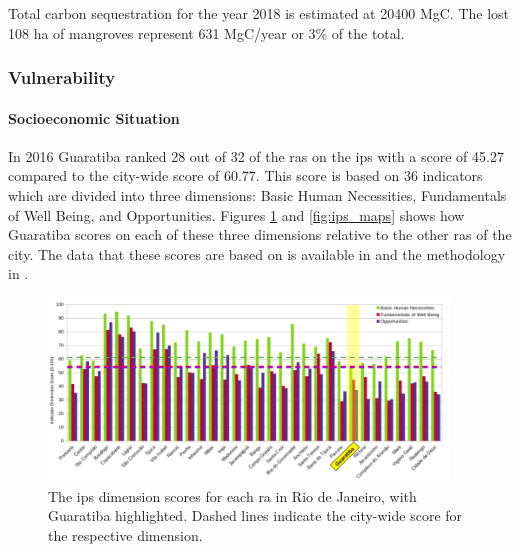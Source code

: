 Total carbon sequestration for the year 2018 is estimated at 20400 MgC. The lost 108 ha of mangroves represent 631 MgC/year or 3\% of the total. 

\subsubsection{Vulnerability}

\paragraph{Socioeconomic Situation} \leavevmode\newline

In 2016 Guaratiba ranked 28 out of 32 of the \acp{ra} on the \ac{ips} with a score of 45.27 compared to the city-wide score of 60.77. This score is based on 36 indicators which are divided into three dimensions: Basic Human Necessities, Fundamentals of Well Being, and Opportunities. Figures \ref{fig:social_progress_indicator} and \ref{fig:ips_maps} shows how Guaratiba scores on each of these three dimensions relative to the other \acp{ra} of the city. The data that these scores are based on is available in \cite{institutopereirapassosBaseDadosIndice2022} and the methodology in \cite{puliciRelatorioMetodologicoIndice2016}.

\begin{figure}[!htb] 
\centering
\includegraphics[width=0.95\textwidth]{Figures/chap4/social_progress_indicator.png}
\caption[Graph of Social Progress Indicator for Rio de Janeiro]{The \acf{ips} dimension scores for each \ac{ra} in Rio de Janeiro, with Guaratiba highlighted. Dashed lines indicate the city-wide score for the respective dimension.}
\label{fig:social_progress_indicator}
\end{figure}

